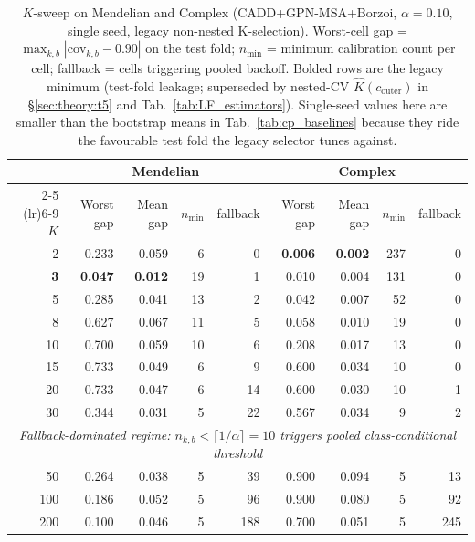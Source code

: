 \begin{table}[h]
\centering
\small
\caption{$K$-sweep on Mendelian and Complex (CADD+GPN-MSA+Borzoi, $\alpha = 0.10$, single seed, legacy non-nested K-selection). Worst-cell gap = $\max_{k,b} |\mathrm{cov}_{k,b} - 0.90|$ on the test fold; $n_{\min}$ = minimum calibration count per cell; fallback = cells triggering pooled backoff. Bolded rows are the legacy minimum (test-fold leakage; superseded by nested-CV $\hat K(c_{\mathrm{outer}})$ in §\ref{sec:theory:t5} and Tab.~\ref{tab:LF_estimators}). Single-seed values here are smaller than the bootstrap means in Tab.~\ref{tab:cp_baselines} because they ride the favourable test fold the legacy selector tunes against.}
\label{tab:ksweep}
\begin{tabular}{rrrrrrrrr}
\toprule
& \multicolumn{4}{c}{Mendelian} & \multicolumn{4}{c}{Complex} \\
\cmidrule(lr){2-5} \cmidrule(lr){6-9}
$K$ & Worst gap & Mean gap & $n_{\min}$ & fallback & Worst gap & Mean gap & $n_{\min}$ & fallback \\
\midrule
2   & 0.233 & 0.059 & 6  & 0   & \textbf{0.006} & \textbf{0.002} & 237 & 0  \\
\textbf{3}   & \textbf{0.047} & \textbf{0.012} & 19 & 1   & 0.010 & 0.004 & 131 & 0  \\
5   & 0.285 & 0.041 & 13 & 2   & 0.042 & 0.007 & 52  & 0  \\
8   & 0.627 & 0.067 & 11 & 5   & 0.058 & 0.010 & 19  & 0  \\
10  & 0.700 & 0.059 & 10 & 6   & 0.208 & 0.017 & 13  & 0  \\
15  & 0.733 & 0.049 & 6  & 9   & 0.600 & 0.034 & 10  & 0  \\
20  & 0.733 & 0.047 & 6  & 14  & 0.600 & 0.030 & 10  & 1  \\
30  & 0.344 & 0.031 & 5  & 22  & 0.567 & 0.034 & 9   & 2  \\
\midrule
\multicolumn{9}{c}{\emph{Fallback-dominated regime: $n_{k,b} < \lceil 1/\alpha\rceil = 10$ triggers pooled class-conditional threshold}} \\
\midrule
50  & 0.264 & 0.038 & 5  & 39  & 0.900 & 0.094 & 5   & 13 \\
100 & 0.186 & 0.052 & 5  & 96  & 0.900 & 0.080 & 5   & 92 \\
200 & 0.100 & 0.046 & 5  & 188 & 0.700 & 0.051 & 5   & 245 \\
\bottomrule
\end{tabular}
\end{table}

